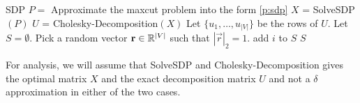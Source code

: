 \documentclass[12pt,
    driverfallback=dvipdfm,
 	openany,
    a4paper,
    toc=bibliography,
    twoside,
    numbers=noenddot]{article}              %
\begin{document}
\begin{algorithm}[h!]
\caption{$ApproximateMaxCut$}
\label{alg:maxcut}
\begin{algorithmic}[1]
\STATE {}
\STATE {}
\STATE SDP $P =$ Approximate the maxcut problem into the form \ref{p:sdp}
\STATE {}
\STATE $X$ = SolveSDP$(P)$ 
\STATE {}
\STATE $U$ = Cholesky-Decomposition$(X)$ 
\STATE Let $\{u_1, \dots, u_{|V|}\}$ be the rows of $U$.
\STATE Let $S = \emptyset$. 
\STATE Pick a random vector $\mathbf r \in \mathbb{R}^{|V|}$ such that $|\vec r|_2 = 1$.	
		\STATE {}
		\STATE add $i$ to $S$ 
	\ENDIF
	\STATE {}
\ENDFOR
\RETURN $S$
\end{algorithmic}
\end{algorithm}

\begin{mdframed}[backgroundcolor=light-gray, linecolor=light-gray]
For analysis, we will assume that SolveSDP and Cholesky-Decomposition gives the optimal matrix $X$ and the exact decomposition matrix $U$ and not a $\delta$ approximation in either of the two cases. 
\end{mdframed}
\end{document}
